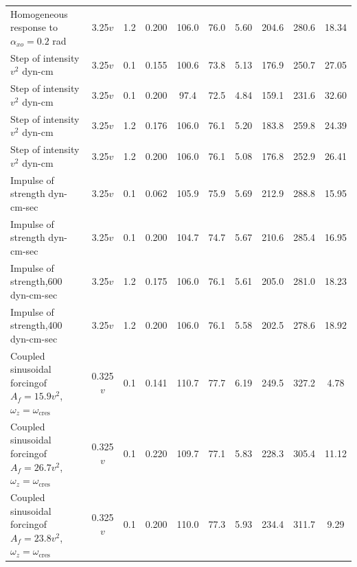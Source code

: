\begin{longtable}{@{}>{\raggedright\arraybackslash}p{4.1cm}cc
    S[table-format=1.3]S[table-format=3.1]S[table-format=2.1]S[table-format=1.2]
    S[table-format=3.1]S[table-format=3.1]S[table-format=2.2]@{}}
  Homogeneous response to\newline $\alpha_{xo} = 0.2$ rad
    & 3.25$v$ & 1.2 & 0.200 & 106.0 & 76.0 & 5.60 & 204.6 & 280.6 & 18.34 \\[2pt]
  Step of intensity$v^{2}$ dyn-cm
    & 3.25$v$ & 0.1 & 0.155 & 100.6 & 73.8 & 5.13 & 176.9 & 250.7 & 27.05 \\[2pt]
  Step of intensity$v^{2}$ dyn-cm
    & 3.25$v$ & 0.1 & 0.200 & 97.4 & 72.5 & 4.84 & 159.1 & 231.6 & 32.60 \\[2pt]
  Step of intensity$v^{2}$ dyn-cm
    & 3.25$v$ & 1.2 & 0.176 & 106.0 & 76.1 & 5.20 & 183.8 & 259.8 & 24.39 \\[2pt]
  Step of intensity$v^{2}$ dyn-cm
    & 3.25$v$ & 1.2 & 0.200 & 106.0 & 76.1 & 5.08 & 176.8 & 252.9 & 26.41 \\[2pt]
  Impulse of strength dyn-cm-sec
    & 3.25$v$ & 0.1 & 0.062 & 105.9 & 75.9 & 5.69 & 212.9 & 288.8 & 15.95 \\[2pt]
  Impulse of strength dyn-cm-sec
    & 3.25$v$ & 0.1 & 0.200 & 104.7 & 74.7 & 5.67 & 210.6 & 285.4 & 16.95 \\[2pt]
  Impulse of strength,600 dyn-cm-sec
    & 3.25$v$ & 1.2 & 0.175 & 106.0 & 76.1 & 5.61 & 205.0 & 281.0 & 18.23 \\[2pt]
  Impulse of strength,400 dyn-cm-sec
    & 3.25$v$ & 1.2 & 0.200 & 106.0 & 76.1 & 5.58 & 202.5 & 278.6 & 18.92 \\[2pt]
  Coupled sinusoidal forcing\newline of $A_f = 15.9v^{2}$, $\omega_z = \omega_{\mathrm{cres}}$
    & 0.325$v$ & 0.1 & 0.141 & 110.7 & 77.7 & 6.19 & 249.5 & 327.2 & 4.78 \\[2pt]
  Coupled sinusoidal forcing\newline of $A_f = 26.7v^{2}$, $\omega_z = \omega_{\mathrm{cres}}$
    & 0.325$v$ & 0.1 & 0.220 & 109.7 & 77.1 & 5.83 & 228.3 & 305.4 & 11.12 \\[2pt]
  Coupled sinusoidal forcing\newline of $A_f = 23.8v^{2}$, $\omega_z = \omega_{\mathrm{cres}}$
    & 0.325$v$ & 0.1 & 0.200 & 110.0 & 77.3 & 5.93 & 234.4 & 311.7 & 9.29 \\
\end{longtable}
\endgroup

